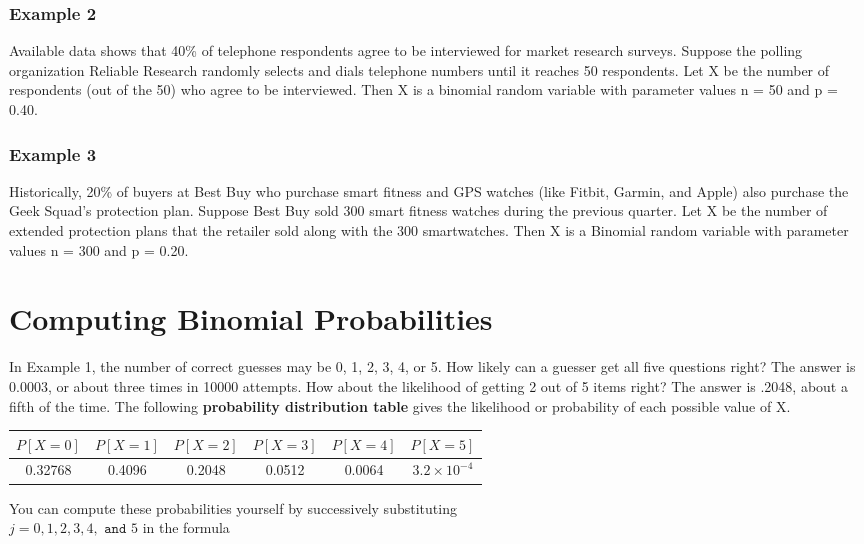 \documentclass[11pt]{book}\usepackage[]{graphicx}\usepackage[]{color}
\begin{document}
\subsubsection{Example 2} Available data shows that 40\% of telephone respondents agree to be interviewed for market research surveys.  Suppose the polling organization Reliable Research randomly selects and dials telephone numbers until it reaches 50 respondents.  Let X be the number of respondents (out of the 50) who agree to be interviewed.  Then X is a binomial random variable with parameter values n = 50 and p = 0.40.

\subsubsection{Example 3} Historically, 20\% of buyers at Best Buy who purchase smart fitness and GPS watches (like Fitbit, Garmin, and Apple) also purchase the Geek Squad’s protection plan.  Suppose Best Buy sold 300 smart fitness watches during the previous quarter.  Let X be the number of extended protection plans that the retailer sold along with the 300 smartwatches.  Then X is a Binomial random variable with parameter values n = 300 and p = 0.20.

\section{Computing Binomial Probabilities}

In Example 1, the number of correct guesses may be 0, 1, 2, 3, 4, or 5.  How likely can a guesser get all five questions right? The answer is 0.0003, or about three times in 10000 attempts.  How about the likelihood of getting 2 out of 5 items right?  The answer is .2048, about a fifth of the time.  The following \textbf{probability distribution table} gives the likelihood or probability of each possible value of X.



\begin{center}
\begin{tabular}{@{} cccccc @{}} \hline
$P[X = 0]$ & $P[X = 1]$ & $P[X = 2]$ & $P[X = 3]$ & $P[X = 4]$ & $P[X = 5]$ \\ \hline
0.32768 & 0.4096 & 0.2048 & 0.0512 & 0.0064 & \ensuremath{3.2\times 10^{-4}} \\ \hline
\end{tabular}
\end{center}

You can compute these probabilities yourself by successively substituting \\ $j = 0, 1, 2, 3, 4, \texttt{ and } 5$ in the formula
\end{document}
